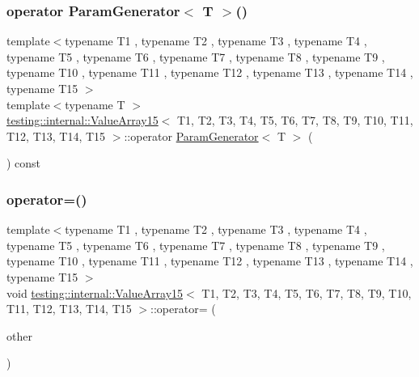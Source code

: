 \subsubsection{\texorpdfstring{operator ParamGenerator$<$ T $>$()}{operator ParamGenerator< T >()}}
{\footnotesize\ttfamily template$<$typename T1 , typename T2 , typename T3 , typename T4 , typename T5 , typename T6 , typename T7 , typename T8 , typename T9 , typename T10 , typename T11 , typename T12 , typename T13 , typename T14 , typename T15 $>$ \\
template$<$typename T $>$ \\
\mbox{\hyperlink{classtesting_1_1internal_1_1_value_array15}{testing\+::internal\+::\+Value\+Array15}}$<$ T1, T2, T3, T4, T5, T6, T7, T8, T9, T10, T11, T12, T13, T14, T15 $>$\+::operator \mbox{\hyperlink{classtesting_1_1internal_1_1_param_generator}{Param\+Generator}}$<$ T $>$ (\begin{DoxyParamCaption}{ }\end{DoxyParamCaption}) const\hspace{0.3cm}{\ttfamily [inline]}}

\mbox{\label{classtesting_1_1internal_1_1_value_array15_a58ef8574996963beeee69e2cb963509d}} 
\subsubsection{\texorpdfstring{operator=()}{operator=()}}
{\footnotesize\ttfamily template$<$typename T1 , typename T2 , typename T3 , typename T4 , typename T5 , typename T6 , typename T7 , typename T8 , typename T9 , typename T10 , typename T11 , typename T12 , typename T13 , typename T14 , typename T15 $>$ \\
void \mbox{\hyperlink{classtesting_1_1internal_1_1_value_array15}{testing\+::internal\+::\+Value\+Array15}}$<$ T1, T2, T3, T4, T5, T6, T7, T8, T9, T10, T11, T12, T13, T14, T15 $>$\+::operator= (\begin{DoxyParamCaption}\item[{const \mbox{\hyperlink{classtesting_1_1internal_1_1_value_array15}{Value\+Array15}}$<$ T1, T2, T3, T4, T5, T6, T7, T8, T9, T10, T11, T12, T13, T14, T15 $>$ \&}]{other }\end{DoxyParamCaption})\hspace{0.3cm}{\ttfamily [private]}}



